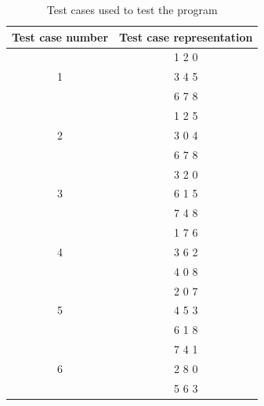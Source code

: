 \documentclass[journal]{IEEEtran}
\begin{document}
\begin{table}[h]
\renewcommand{\arraystretch}{1.3}
\centering
\caption{Test cases used to test the program}
\begin{tabular}{|c|c|}
\hline
\bfseries Test case number & \bfseries Test case representation \\\hline
   & 1 2 0 \\
 1 & 3 4 5 \\
   & 6 7 8 \\\hline
   & 1 2 5 \\
 2 & 3 0 4 \\
   & 6 7 8 \\\hline
   & 3 2 0 \\
 3 & 6 1 5 \\
   & 7 4 8 \\\hline
   & 1 7 6 \\
 4 & 3 6 2 \\
   & 4 0 8 \\\hline   
   & 2 0 7 \\
 5 & 4 5 3 \\
   & 6 1 8 \\\hline
   & 7 4 1 \\
 6 & 2 8 0 \\
   & 5 6 3 \\\hline 
\end{tabular}
\label{tab:testCases}
\end{table}
\end{document}
